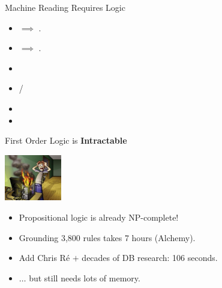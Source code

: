 \begin{frame}{Machine Reading Requires Logic}

\begin{itemize}
\item {} $\implies$ .
\item {} $\implies$ .
\end{itemize}
\vspace{1ex}
\pause

\begin{itemize}
\item {}
\item {} / 
\end{itemize}
\vspace{1ex}
\pause

\begin{itemize}
\item {}
\item {}
\end{itemize}

\end{frame}


\begin{frame}{First Order Logic is \textbf{Intractable}}
\begin{center}
  \includegraphics[height=2cm]{../img/overheating.jpg}
\end{center}

\begin{itemize}
  \item Propositional logic is already NP-complete!
\end{itemize}
\vspace{1ex}
\pause

\begin{itemize}
  \item Grounding 3,800 rules takes 7 hours (Alchemy).
  \pause
  \item Add Chris R\'{e} $+$ decades of DB research: 106 seconds.
  \item $\dots$ but still needs lots of memory.
\end{itemize}

\end{frame}

